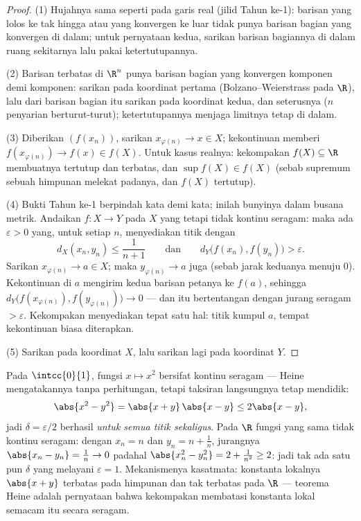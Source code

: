\begin{proof}
(1) Hujahnya sama seperti pada garis real (jilid Tahun ke-1): barisan yang
lolos ke tak hingga atau yang konvergen ke luar tidak punya barisan bagian
yang konvergen di dalam; untuk pernyataan kedua, sarikan barisan bagiannya
di dalam ruang  sekitarnya lalu pakai ketertutupannya.

(2) Barisan terbatas di $\R^n$ punya barisan bagian yang konvergen
komponen demi komponen: sarikan pada koordinat pertama
(Bolzano--Weierstrass pada $\R$), lalu dari barisan bagian itu sarikan
pada koordinat kedua, dan seterusnya ($n$ penyarian berturut-turut);
ketertutupannya menjaga limitnya tetap di dalam.

(3) Diberikan $(f(x_n))$, sarikan $x_{\varphi(n)} \to x \in X$;
kekontinuan memberi $f(x_{\varphi(n)}) \to f(x) \in f(X)$. Untuk kasus
realnya: kekompakan $f(X) \subseteq \R$ membuatnya tertutup dan terbatas,
dan $\sup f(X) \in f(X)$ (sebab supremum sebuah himpunan melekat padanya,
dan $f(X)$ tertutup).

(4) Bukti Tahun ke-1 berpindah kata demi kata; inilah bunyinya dalam
busana metrik. Andaikan $f \colon X \to Y$  pada $X$ yang 
tetapi tidak kontinu seragam: maka ada $\varepsilon > 0$ yang, untuk
setiap $n$, menyediakan titik dengan
\[
d_X(x_n, y_n) \leq \frac{1}{n+1}
\qquad\text{dan}\qquad
d_Y\bigl(f(x_n), f(y_n)\bigr) > \varepsilon .
\]
Sarikan $x_{\varphi(n)} \to a \in X$; maka $y_{\varphi(n)} \to
a$ juga (sebab jarak keduanya menuju $0$). Kekontinuan di $a$
mengirim kedua barisan petanya ke $f(a)$, sehingga
$d_Y\bigl(f(x_{\varphi(n)}), f(y_{\varphi(n)})\bigr) \to 0$ ---
dan itu bertentangan dengan jurang seragam $> \varepsilon$. Kekompakan
menyediakan tepat satu hal: titik kumpul $a$, tempat kekontinuan biasa
diterapkan.

(5) Sarikan pada koordinat $X$, lalu sarikan lagi pada koordinat
$Y$.
\end{proof}

\begin{example}\label{ex:b2:metric:heinework}
Pada $\intcc{0}{1}$, fungsi $x \mapsto x^2$ bersifat kontinu
seragam --- Heine mengatakannya tanpa perhitungan, tetapi taksiran
langsungnya tetap mendidik:
\[
\abs{x^2 - y^2} = \abs{x + y}\,\abs{x - y} \leq 2\abs{x - y},
\]
jadi $\delta = \varepsilon/2$ berhasil \emph{untuk semua titik
sekaligus}. Pada $\R$ fungsi yang sama tidak kontinu seragam:
dengan $x_n = n$ dan $y_n = n + \frac1n$, jurangnya $\abs{x_n - y_n}
= \frac1n \to 0$ padahal $\abs{x_n^2 - y_n^2} = 2 + \frac1{n^2}
\geq 2$: jadi tak ada satu pun $\delta$ yang melayani $\varepsilon = 1$.
Mekanismenya kasatmata: konstanta  lokalnya $\abs{x + y}$
terbatas pada himpunan  dan tak terbatas pada $\R$ --- teorema
Heine adalah pernyataan bahwa kekompakan membatasi konstanta lokal
semacam itu secara seragam.
\end{example}

